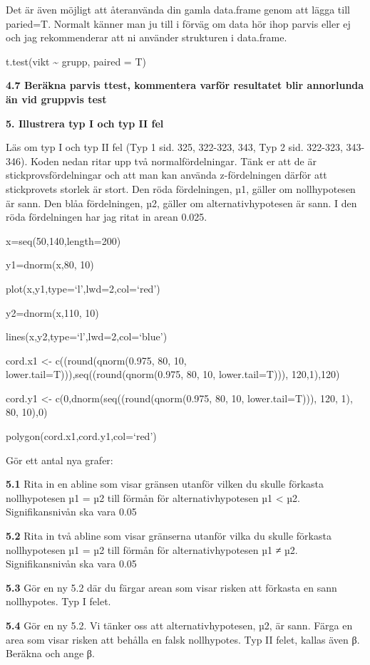 \documentclass[
  letterpaper,
  DIV=11,
  numbers=noendperiod]{scrartcl}
\begin{document}
Det är även möjligt att återanvända din gamla data.frame genom att lägga
till paried=T. Normalt känner man ju till i förväg om data hör ihop
parvis eller ej och jag rekommenderar att ni använder strukturen i
data.frame.

t.test(vikt \textasciitilde{} grupp, paired = T)

\textbf{4.7 Beräkna parvis ttest, kommentera varför resultatet blir
annorlunda än vid gruppvis test}

\textbf{5. Illustrera typ I och typ II fel}

Läs om typ I och typ II fel (Typ 1 sid. 325, 322-323, 343, Typ 2 sid.
322-323, 343-346). Koden nedan ritar upp två normalfördelningar. Tänk er
att de är stickprovsfördelningar och att man kan använda z-fördelningen
därför att stickprovets storlek är stort. Den röda fördelningen, µ1,
gäller om nollhypotesen är sann. Den blåa fördelningen, µ2, gäller om
alternativhypotesen är sann. I den röda fördelningen har jag ritat in
arean 0.025.

x=seq(50,140,length=200)

y1=dnorm(x,80, 10)

plot(x,y1,type=`l',lwd=2,col=`red')

y2=dnorm(x,110, 10)

lines(x,y2,type=`l',lwd=2,col=`blue')

cord.x1 \textless- c((round(qnorm(0.975, 80, 10,
lower.tail=T))),seq((round(qnorm(0.975, 80, 10, lower.tail=T))),
120,1),120)

cord.y1 \textless- c(0,dnorm(seq((round(qnorm(0.975, 80, 10,
lower.tail=T))), 120, 1), 80, 10),0)

polygon(cord.x1,cord.y1,col=`red')

Gör ett antal nya grafer:

\textbf{5.1} Rita in en abline som visar gränsen utanför vilken du
skulle förkasta nollhypotesen µ1 = µ2 till förmån för
alternativhypotesen µ1 \textless{} µ2. Signifikansnivån ska vara 0.05

\textbf{5.2} Rita in två abline som visar gränserna utanför vilka du
skulle förkasta nollhypotesen µ1 = µ2 till förmån för
alternativhypotesen µ1 ≠ µ2. Signifikansnivån ska vara 0.05

\textbf{5.3} Gör en ny 5.2 där du färgar arean som visar risken att
förkasta en sann nollhypotes. Typ I felet.

\textbf{5.4} Gör en ny 5.2. Vi tänker oss att alternativhypotesen, µ2,
är sann. Färga en area som visar risken att behålla en falsk
nollhypotes. Typ II felet, kallas även β. Beräkna och ange β.
\end{document}
